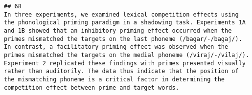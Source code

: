 \documentclass[
  english,
  man]{apa6}
\begin{document}
\begin{verbatim}
## 68                                                                                                                                                                                                                                                                                                                                                                                                                                                                                                                                                                                                                                                                                                                                                                                                                                                                                                                                                                                                                                                                                                                                                                                                                                                                                                                                                                                                                                                                                                                                                                                                                                                                                                                                                                                                                                                                                                                                                                                     In three experiments, we examined lexical competition effects using the phonological priming paradigm in a shadowing task. Experiments 1A and 1B showed that an inhibitory priming effect occurred when the primes mismatched the targets on the last phoneme (/bagar/-/bagaj/). In contrast, a facilitatory priming effect was observed when the primes mismatched the targets on the medial phoneme (/viraj/-/vilaj/). Experiment 2 replicated these findings with primes presented visually rather than auditorily. The data thus indicate that the position of the mismatching phoneme is a critical factor in determining the competition effect between prime and target words.

\end{verbatim}
\end{document}
